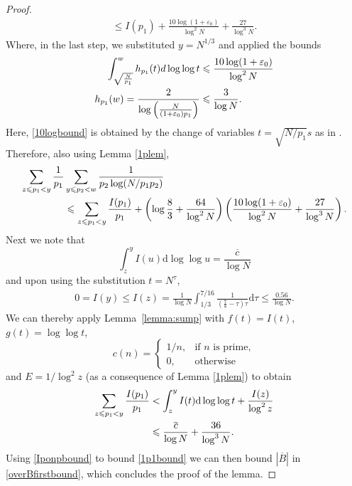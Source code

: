 \documentclass[12pt]{amsart}
\begin{document}
\begin{proof}
\begin{align*}
\le I(p_1)+\frac{10\log (1+\varepsilon_0)}{\log^2 N}+ \frac{27}{\log^3 N}.
\end{align*}
Where, in the last step, we substituted $y=N^{1/3}$ and applied the bounds
\begin{align}
\int_{\sqrt{\frac{N}{p_1}}}^wh_{p_1}(t) d \log \log t&\le \frac{10\log (1+\varepsilon_0)}{\log^2 N}\label{10logbound}\\
h_{p_1}(w)=\frac{2}{\log \left(\frac{N}{(1+\varepsilon_0)p_1}\right)}&\le \frac{3}{\log N}.\notag
\end{align} 
Here, \eqref{10logbound} is obtained by the change of variables $t=\sqrt{N/p_1}s$ as in \cite[p. 290]{Nathanson}. Therefore, also using Lemma \ref{1plem},
\begin{align}
\sum_{z \le p_1 <y}\frac{1}{p_1}&\sum_{y\le p_2<w}\frac{1}{ p_2 \log (N/p_1p_2)}\notag\\ &
\le \sum_{z \le p_1 <y}\frac{I(p_1)}{p_1}+\left(\log \frac{8}{3} +\frac{64}{\log^2 N} \right)\left( \frac{10\log (1+\varepsilon_0)}{\log^2 N}+ \frac{27}{\log^3 N}\right).\label{1p1bound}
\end{align}
Next we note that \cite[p. 291]{Nathanson}
\begin{equation*}
    \int_z^y I(u)\mathrm{d}\log \log u=\frac{\overline{c}}{\log N}
\end{equation*}
and upon using the substitution $t=N^{\tau}$,
\begin{align*}
    0=I(y)\le I(z)=\frac{1}{\log N}\int_{1/3}^{7/16}\frac{1}{(\frac{7}{8}-\tau)\tau}\mathrm{d}\tau\le\frac{0.56}{\log N}.
\end{align*}
We can thereby apply Lemma~\ref{lemma:sump} with $f(t)=I(t)$, $g(t)=\log\log t$, 
\begin{equation*}
    c(n)=
    \begin{cases}
        1/n,&\text{if $n$ is prime},\\
        0,&\text{otherwise}
    \end{cases}
\end{equation*}
and $E=1/\log^2 z$ (as a consequence of Lemma \ref{1plem}) to obtain
\begin{align}
\sum_{z \le p_1 <y}\frac{I(p_1)}{p_1}&<\int_z^y I(t)\mathrm{d}\log \log t+ \frac{I(z)}{\log^2 z}\notag\\ & \le \frac{\overline{c}}{\log N} +\frac{36}{\log^3 N}.\label{Iponpbound}
\end{align}
Using \eqref{Iponpbound} to bound \eqref{1p1bound} we can then bound $|\overline{B}|$ in \eqref{overBfirstbound}, which concludes the proof of the lemma.
\end{proof}
\end{document}
